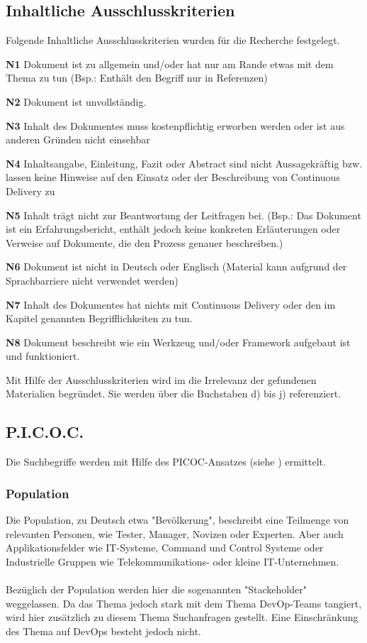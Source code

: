 \subsection{Inhaltliche Ausschlusskriterien}
\label{subsec:inhaltlicheAusschlusskriterien}
Folgende Inhaltliche Ausschlusskriterien wurden für die Recherche festgelegt.
\begin{list}{label}{spacing}
	\item[\textbf{N1}] Dokument ist zu allgemein und/oder hat nur am Rande etwas mit dem Thema zu tun (Bsp.: Enthält den Begriff nur in Referenzen)
	\item[\textbf{N2}] Dokument ist unvollständig.
	\item[\textbf{N3}] Inhalt des Dokumentes muss kostenpflichtig erworben werden oder ist aus anderen Gründen nicht einsehbar
	\item[\textbf{N4}] Inhaltsangabe, Einleitung, Fazit oder Abstract sind nicht Aussagekräftig bzw. lassen keine Hinweise auf den Einsatz oder der Beschreibung von Continuous Delivery zu
	\item[\textbf{N5}] Inhalt trägt nicht zur Beantwortung der Leitfragen bei. (Bsp.: Das Dokument ist ein Erfahrungsbericht, enthält jedoch keine konkreten Erläuterungen oder Verweise auf Dokumente, die den Prozess genauer beschreiben.)
	\item[\textbf{N6}] Dokument ist nicht in Deutsch oder Englisch (Material kann aufgrund der Sprachbarriere nicht verwendet werden)
	\item[\textbf{N7}] Inhalt des Dokumentes hat nichts mit Continuous Delivery oder den im Kapitel  genannten Begrifflichkeiten zu tun.
	\item[\textbf{N8}] Dokument beschreibt wie ein Werkzeug und/oder Framework aufgebaut ist und funktioniert.
\end{list}
Mit Hilfe der Ausschlusskriterien wird im  die Irrelevanz der gefundenen Materialien begründet. Sie werden über die Buchstaben d) bis j) referenziert.

\subsection{P.I.C.O.C.}
\label{subsec:picoc}
Die Suchbegriffe werden mit Hilfe des PICOC-Ansatzes (siehe \cite{Kitchenham2007}) ermittelt.

\subsubsection*{Population}
\label{picoc:population}
Die Population, zu Deutsch etwa "Bevölkerung", beschreibt eine Teilmenge von relevanten Personen, wie Tester, Manager, Novizen oder Experten. Aber auch Applikationsfelder wie IT-Systeme, Command und Control Systeme oder Industrielle Gruppen wie Telekommunikations- oder kleine IT-Unternehmen.
\\\\
Bezüglich der Population werden hier die sogenannten "Stackeholder" weggelassen. Da das Thema jedoch stark mit dem Thema DevOp-Teams tangiert, wird hier zusätzlich zu diesem Thema Suchanfragen gestellt. Eine Einschränkung des Thema auf DevOps besteht jedoch nicht.


